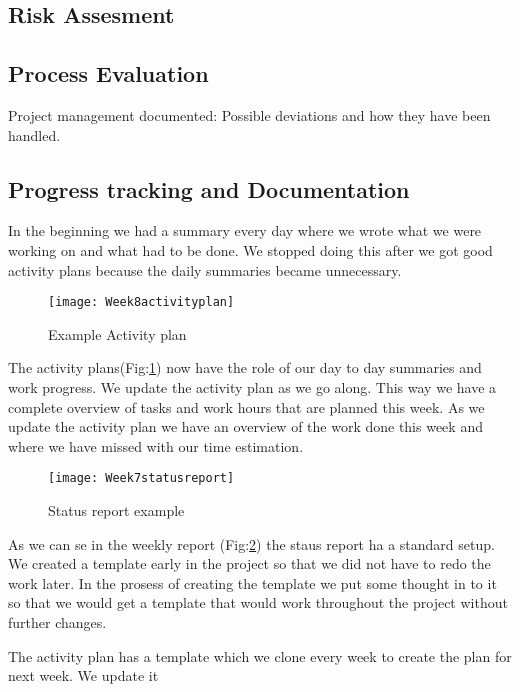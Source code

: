     \subsection{Risk Assesment}\label{Risk Assesment}
    
    \subsection{Process Evaluation}\label{Process Evaluation}
    
    Project management documented: 
    Possible deviations and how they have
been handled. 

    \subsection{Progress tracking and Documentation}\label{Progress tracking and Documentation}
    In the beginning we had a summary every day where we wrote what we were working on and what had to be done. We stopped doing this after we got good activity plans because the daily summaries became unnecessary. 
    
    \begin{figure}[h]
        \centering
        \texttt{[image: Week8activityplan]}
        \caption{Example Activity plan}
        \label{fig:Week8activityplan}
    \end{figure}
    
    The activity plans(Fig:\ref{fig:Week8activityplan}) now have the role of our day to day summaries and work progress. We update the activity plan as we go along. This way we have a complete overview of tasks and work hours that are planned this week. As we update the activity plan we have an overview of the work done this week and where we have missed with our time estimation. 
    
    \begin{figure}[h]
        \centering
        \texttt{[image: Week7statusreport]}
        \caption{Status report example}
        \label{fig:Week7statusreport}
    \end{figure}
    
    As we can se in the weekly report (Fig:\ref{fig:Week7statusreport}) the staus report ha a standard setup. We created a template early in the project so that we did not have to redo the work later. In the prosess of creating the template we put some thought in to it so that we would get a template that would work throughout the project without further changes. 
    

    
    The activity plan has a template which we clone every week to create the plan for next week. We update it  






